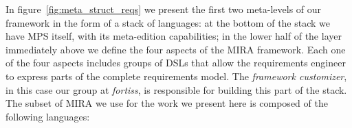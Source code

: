 In figure~\ref{fig:meta_struct_reqs} we present the first two meta-levels of our
framework in the form of a stack of languages: at the bottom of the stack we
have MPS itself, with its meta-edition capabilities; in the lower half of the
layer immediately above we define the four aspects of the MIRA framework. Each one of the four
aspects includes groups of DSLs that allow the requirements engineer to express
parts of the complete requirements model. The \emph{framework customizer}, in
this case our group at \emph{fortiss}, is responsible for building this part of
the stack. The subset of MIRA we use for the work we present here is composed of
the following languages:
\vspace{-.1cm}
